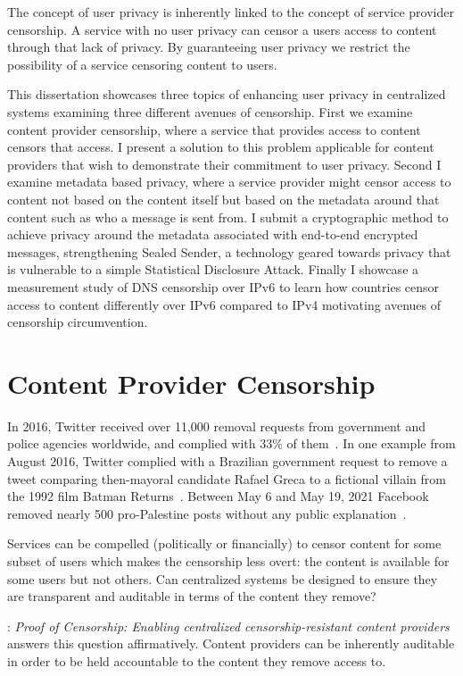 The concept of user privacy is inherently linked to the concept of service
provider censorship. A service with no user privacy can censor a users access to
content through that lack of privacy. By guaranteeing user privacy we restrict
the possibility of a service censoring content to users. 

This dissertation showcases three topics of enhancing user privacy in
centralized systems examining three different avenues of censorship. First we
examine content provider censorship, where a service that provides access to
content censors that access. I present a solution to this problem applicable for
content providers that wish to demonstrate their commitment to user privacy.
Second I examine metadata based privacy, where a service provider might censor
access to content not based on the content itself but based on the metadata
around that content such as who a message is sent from. I submit a cryptographic
method to achieve privacy around the metadata associated with end-to-end
encrypted messages, strengthening Sealed Sender, a technology geared towards
privacy that is vulnerable to a simple Statistical Disclosure Attack. Finally I
showcase a measurement study of DNS censorship over IPv6 to learn how countries
censor access to content differently over IPv6 compared to IPv4 motivating
avenues of censorship circumvention.

\section{Content Provider Censorship}
In 2016, Twitter received over 11,000 removal requests from government and
police agencies worldwide, and complied with 33\% of
them~\cite{twitter-transparency}. In one example from August 2016, Twitter
complied with a Brazilian government request to remove a tweet comparing
then-mayoral candidate Rafael Greca to a fictional villain from the 1992 film
Batman Returns~\cite{twitter-rafael-greca}. Between May 6 and May 19, 2021
Facebook removed nearly 500 pro-Palestine posts without any public
explanation~\cite{fb-palestine}.

Services can be compelled (politically or financially) to censor content for
some subset of users which makes the censorship less overt: the content is
available for some users but not others. Can centralized systems be designed to
ensure they are transparent and auditable in terms of the content they remove?

: \emph{Proof of Censorship: Enabling centralized
censorship-resistant content providers} answers this question affirmatively.
Content providers can be inherently auditable in order to be held accountable to
the content they remove access to.

